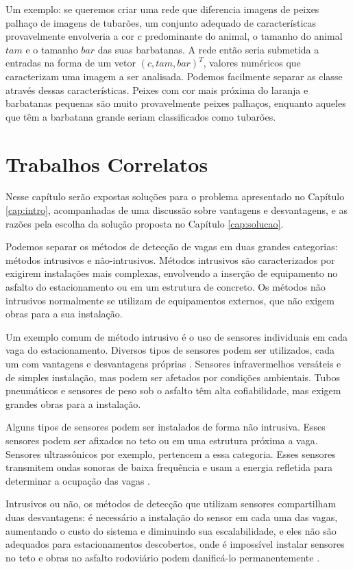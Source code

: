 Um exemplo: se queremos criar uma rede que diferencia imagens de peixes palhaço de imagens de tubarões, um conjunto adequado de características provavelmente envolveria a cor $c$ predominante do animal, o tamanho do animal $tam$ e o tamanho $bar$ das suas barbatanas. A rede então seria submetida a entradas na forma de um vetor $(c, tam, bar)^T$, valores numéricos que caracterizam uma imagem a ser analisada. Podemos facilmente separar as classe através dessas características. Peixes com cor mais próxima do laranja e barbatanas pequenas são muito provavelmente peixes palhaços, enquanto aqueles que têm a barbatana grande seriam classificados como tubarões.

\section{Trabalhos Correlatos} \label{cap:trabalhos}

Nesse capítulo serão expostas soluções para o problema apresentado no Capítulo \ref{cap:intro}, acompanhadas de uma discussão sobre vantagens e desvantagens, e as razões pela escolha da solução proposta no Capítulo \ref{cap:solucao}.

Podemos separar os métodos de detecção de vagas em duas grandes categorias: métodos intrusivos e não-intrusivos. Métodos intrusivos são caracterizados por exigirem instalações mais complexas, envolvendo a inserção de equipamento no asfalto do estacionamento ou em um estrutura de concreto. Os métodos não intrusivos normalmente se utilizam de equipamentos externos, que não exigem obras para a sua instalação.

Um exemplo comum de método intrusivo é o uso de sensores individuais em cada vaga do estacionamento. Diversos tipos de sensores podem ser utilizados, cada um com vantagens e desvantagens próprias \cite{idris09}. Sensores infravermelhos versáteis e de simples instalação, mas podem ser afetados por condições ambientais. Tubos pneumáticos e sensores de peso sob o asfalto têm alta cofiabilidade, mas exigem grandes obras para a instalação. 

Alguns tipos de sensores podem ser instalados de forma não intrusiva. Esses sensores podem ser afixados no teto ou em uma estrutura próxima a vaga. Sensores ultrassônicos por exemplo, pertencem a essa categoria. Esses sensores transmitem ondas sonoras de baixa frequência e usam a energia refletida para determinar a ocupação das vagas \cite{kianpisheh2012smart}.

Intrusivos ou não, os métodos de detecção que utilizam sensores compartilham duas desvantagens: é necessário a instalação do sensor em cada uma das vagas, aumentando o custo do sistema e diminuindo sua escalabilidade, e eles não são adequados para estacionamentos descobertos, onde é impossível instalar sensores no teto e obras no asfalto rodoviário podem danificá-lo permanentemente \cite{idris09}.

